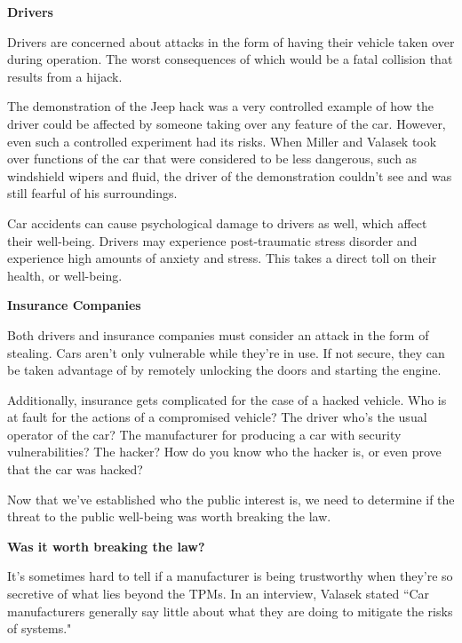 \documentclass[12pt]{article}
\begin{document}
\begin{multicols}{2}
\vspace{.2cm}\textbf{Drivers}

 Drivers are concerned about attacks in the form of having their vehicle taken over during operation. \cite{officialPaper} The worst consequences of which would be a fatal collision that results from a hijack. 

The demonstration of the Jeep hack was a very controlled example of how the driver could be affected by someone taking over any feature of the car. However, even such a controlled experiment had its risks. When Miller and Valasek took over functions of the car that were considered to be less dangerous, such as windshield wipers and fluid, the driver of the demonstration couldn't see and was still fearful of his surroundings.\cite{dangerousJeepHack}\cite{wired}

Car accidents can cause psychological damage to drivers as well, which affect their well-being. Drivers may experience post-traumatic stress disorder and experience high amounts of anxiety and stress.\cite{trauma} This takes a direct toll on their health, or well-being. 

\vspace{.2cm}\textbf{Insurance Companies}

Both drivers and insurance companies must consider an attack in the form of stealing. Cars aren't only vulnerable while they're in use. If not secure, they can be taken advantage of by remotely unlocking the doors and starting the engine. \cite{hackingRisk}

Additionally, insurance gets complicated for the case of a hacked vehicle. Who is at fault for the actions of a compromised vehicle? The driver who's the usual operator of the car? The manufacturer for producing a car with security vulnerabilities? The hacker? How do you know who the hacker is, or even prove that the car was hacked?  \cite{alanna}

\vspace{.4cm}

Now that we've established who the public interest is, we need to determine if the threat to the public well-being was worth breaking the law. 

\vspace{.2cm}\textbf{Was it worth breaking the law?}

It's sometimes hard to tell if a manufacturer is being trustworthy when they're so secretive of what lies beyond the TPMs. In an interview, Valasek stated ``Car manufacturers generally say little about what they are doing to mitigate the risks of systems."\cite{hackingRisk}


\end{multicols}
\end{document}

